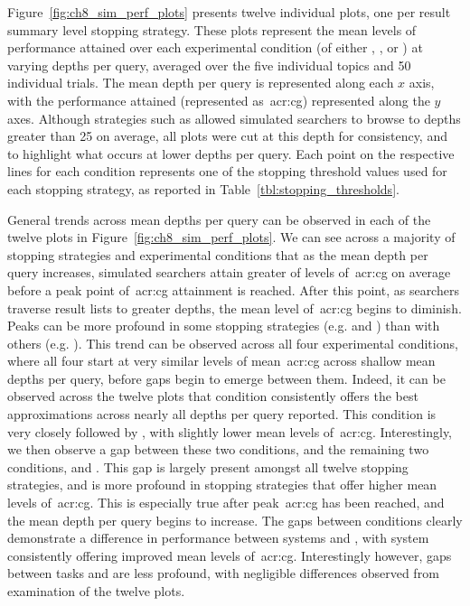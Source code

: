 Figure~\ref{fig:ch8_sim_perf_plots} presents twelve individual plots, one per result summary level stopping strategy. These plots represent the mean levels of performance attained over each experimental condition (of either , ,  or ) at varying depths per query, averaged over the five individual topics and 50 individual trials. The mean depth per query is represented along each $x$ axis, with the performance attained (represented as~\gls{acr:cg}) represented along the $y$ axes. Although strategies such as  allowed simulated searchers to browse to depths greater than 25 on average, all plots were cut at this depth for consistency, and to highlight what occurs at lower depths per query. Each point on the respective lines for each condition represents one of the stopping threshold values used for each stopping strategy, as reported in Table~\ref{tbl:stopping_thresholds}.

General trends across mean depths per query can be observed in each of the twelve plots in Figure~\ref{fig:ch8_sim_perf_plots}. We can see across a majority of stopping strategies and experimental conditions that as the mean depth per query increases, simulated searchers attain greater of levels of~\gls{acr:cg} on average before a peak point of~\gls{acr:cg} attainment is reached. After this point, as searchers traverse result lists to greater depths, the mean level of~\gls{acr:cg} begins to diminish. Peaks can be more profound in some stopping strategies (e.g.  and ) than with others (e.g. ). This trend can be observed across all four experimental conditions, where all four start at very similar levels of mean~\gls{acr:cg} across shallow mean depths per query, before gaps begin to emerge between them. Indeed, it can be observed across the twelve plots that condition  consistently offers the best approximations across nearly all depths per query reported. This condition is very closely followed by , with slightly lower mean levels of~\gls{acr:cg}. Interestingly, we then observe a gap between these two conditions, and the remaining two conditions,  and . This gap is largely present amongst all twelve stopping strategies, and is more profound in stopping strategies that offer higher mean levels of~\gls{acr:cg}. This is especially true after peak~\gls{acr:cg} has been reached, and the mean depth per query begins to increase. The gaps between conditions clearly demonstrate a difference in performance between systems  and , with system  consistently offering improved mean levels of~\gls{acr:cg}. Interestingly however, gaps between tasks  and  are less profound, with negligible differences observed from examination of the twelve plots.

